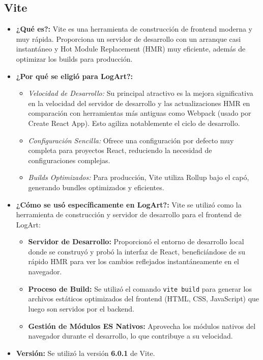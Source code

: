 \subsection{Vite}
\label{sec:vite}

    \begin{itemize}
        \item \textbf{¿Qué es?:} Vite es una herramienta de construcción de frontend moderna y muy rápida. Proporciona un servidor de desarrollo con un arranque casi instantáneo y Hot Module Replacement (HMR) muy eficiente, además de optimizar los builds para producción. \cite{viteWhy}
        \item \textbf{¿Por qué se eligió para LogArt?:}
            \begin{itemize}
                \item \textit{Velocidad de Desarrollo:} Su principal atractivo es la mejora significativa en la velocidad del servidor de desarrollo y las actualizaciones HMR en comparación con herramientas más antiguas como Webpack (usado por Create React App). Esto agiliza notablemente el ciclo de desarrollo.
                \item \textit{Configuración Sencilla:} Ofrece una configuración por defecto muy completa para proyectos React, reduciendo la necesidad de configuraciones complejas.
                \item \textit{Builds Optimizados:} Para producción, Vite utiliza Rollup bajo el capó, generando bundles optimizados y eficientes.
            \end{itemize}
        \item \textbf{¿Cómo se usó específicamente en LogArt?:} Vite se utilizó como la herramienta de construcción y servidor de desarrollo para el frontend de LogArt:
            \begin{itemize}
                \item \textbf{Servidor de Desarrollo:} Proporcionó el entorno de desarrollo local donde se construyó y probó la interfaz de React, beneficiándose de su rápido HMR para ver los cambios reflejados instantáneamente en el navegador.
                \item \textbf{Proceso de Build:} Se utilizó el comando \texttt{vite build} para generar los archivos estáticos optimizados del frontend (HTML, CSS, JavaScript) que luego son servidos por el backend.
                \item \textbf{Gestión de Módulos ES Nativos:} Aprovecha los módulos nativos del navegador durante el desarrollo, lo que contribuye a su velocidad.
            \end{itemize}
        \item \textbf{Versión:} Se utilizó la versión \textbf{6.0.1} de Vite.
    \end{itemize}

